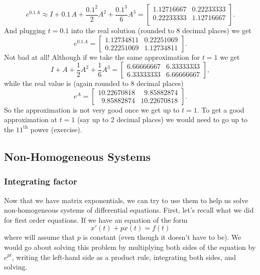 \documentclass{ximera}
\begin{document}
\begin{equation*}
    e^{0.1\,A} \approx I + 0.1\,A + \frac{0.1^2}{2}A^2 + \frac{0.1^3}{6}A^3 =
    \begin{bmatrix}
        1.12716667 & 0.22233333 \\
        0.22233333 & 1.12716667 \\
    \end{bmatrix} .
\end{equation*}
And plugging $t=0.1$ into the real solution (rounded to 8 decimal places) we get
\begin{equation*}
    e^{0.1\,A} = 
    \begin{bmatrix}
        1.12734811 & 0.22251069 \\
        0.22251069 & 1.12734811
    \end{bmatrix} .
\end{equation*}
Not bad at all!  Although if we take the same approximation for $t=1$ we get
\begin{equation*}
    I + A + \frac{1}{2}A^2 + \frac{1}{6}A^3 =
    \begin{bmatrix}
        6.66666667 & 6.33333333 \\
        6.33333333 & 6.66666667
    \end{bmatrix} ,
\end{equation*}
while the real value is (again rounded to 8 decimal places)
\begin{equation*}
    e^{A} =
    \begin{bmatrix}
        10.22670818           & \phantom{0}9.85882874 \\
        \phantom{0}9.85882874 & 10.22670818
    \end{bmatrix} .
\end{equation*}
So the approximation is not very good once we get up to $t=1$.  To get a good approximation at $t=1$ (say up to 2 decimal places) we would need to go up to the ${11}^{\text{th}}$ power (exercise).

\subsection{Non-Homogeneous Systems}
\subsubsection{Integrating factor}

Now that we have matrix exponentials, we can try to use them to help us solve non-homogeneous systems of differential equations. First, let's recall what we did for first order equations. If we have an equation of the form 
\begin{equation*}
    x'(t) + p x(t) = f(t)
\end{equation*}
where will assume that $p$ is constant (even though it doesn't have to be). We would go about solving this problem by multiplying both sides of the equation by $e^{pt}$, writing the left-hand side as a product rule, integrating both sides, and solving. 
\end{document}

